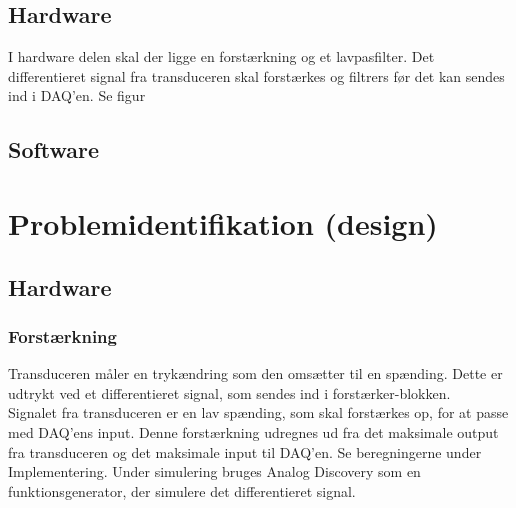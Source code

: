 \subsection{Hardware}
I hardware delen skal der ligge en forstærkning og et lavpasfilter. Det differentieret signal fra transduceren skal forstærkes og filtrers før det kan sendes ind i DAQ'en. Se figur 
\subsection{Software}

\section{Problemidentifikation (design)}
\subsection{Hardware}
\subsubsection{Forstærkning}
Transduceren måler en trykændring som den omsætter til en spænding. Dette er udtrykt ved et differentieret signal, som sendes ind i forstærker-blokken. \\
Signalet fra transduceren er en lav spænding, som skal forstærkes op, for at passe med DAQ'ens input. Denne forstærkning udregnes ud fra det maksimale output fra transduceren og det maksimale input til DAQ'en. Se beregningerne under Implementering.  
\newline
Under simulering bruges Analog Discovery som en funktionsgenerator, der simulere det differentieret signal.  


